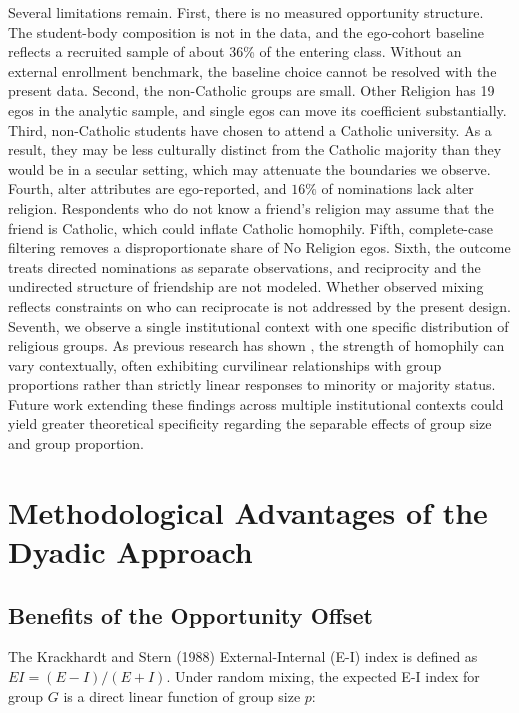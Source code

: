 \documentclass[11pt]{article}
\begin{document}
Several limitations remain. First, there is no measured opportunity structure. The student-body composition is not in the data, and the ego-cohort baseline reflects a recruited sample of about 36\% of the entering class. Without an external enrollment benchmark, the baseline choice cannot be resolved with the present data. Second, the non-Catholic groups are small. Other Religion has 19 egos in the analytic sample, and single egos can move its coefficient substantially. Third, non-Catholic students have chosen to attend a Catholic university. As a result, they may be less culturally distinct from the Catholic majority than they would be in a secular setting, which may attenuate the boundaries we observe. Fourth, alter attributes are ego-reported, and $16\%$ of nominations lack alter religion. Respondents who do not know a friend's religion may assume that the friend is Catholic, which could inflate Catholic homophily. Fifth, complete-case filtering removes a disproportionate share of No Religion egos. Sixth, the outcome treats directed nominations as separate observations, and reciprocity and the undirected structure of friendship are not modeled. Whether observed mixing reflects constraints on who can reciprocate is not addressed by the present design. Seventh, we observe a single institutional context with one specific distribution of religious groups. As previous research has shown \citep{goodreau2009, mcfarland2014network-735}, the strength of homophily can vary contextually, often exhibiting curvilinear relationships with group proportions rather than strictly linear responses to minority or majority status. Future work extending these findings across multiple institutional contexts could yield greater theoretical specificity regarding the separable effects of group size and group proportion.

\newpage



\newpage
\appendix

\section{Methodological Advantages of the Dyadic Approach}
\label{app:methodological-advantages}

\subsection{Benefits of the Opportunity Offset}

The Krackhardt and Stern (1988) External-Internal (E-I) index is defined as $EI = (E - I) / (E + I)$. Under random mixing, the expected E-I index for group $G$ is a direct linear function of group size $p$:
\end{document}
